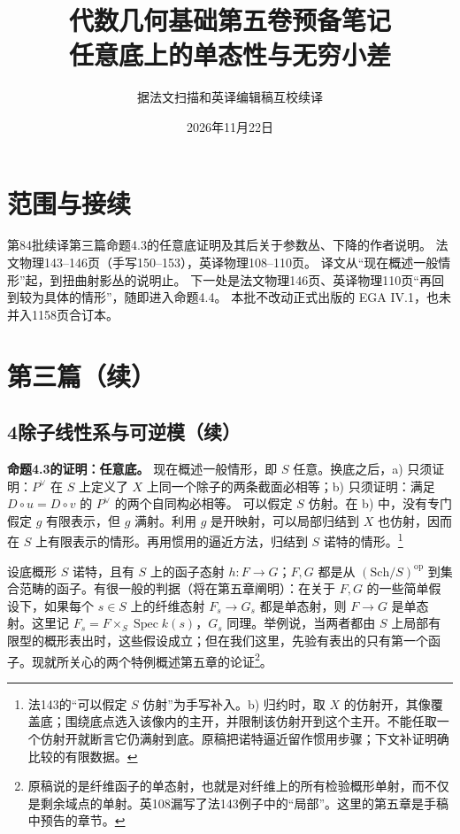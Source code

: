 \documentclass[openany,fontset=fandol]{ctexbook}
\DeclareMathOperator{\Spec}{Spec}
\begin{document}
\title{代数几何基础第五卷预备笔记\\任意底上的单态性与无穷小差}
\author{据法文扫描和英译编辑稿互校续译}
\date{2026年11月22日}
\maketitle
\chapter*{范围与接续}
第84批续译第三篇命题4.3的任意底证明及其后关于参数丛、下降的作者说明。
法文物理143--146页（手写150--153），英译物理108--110页。
译文从“现在概述一般情形”起，到扭曲射影丛的说明止。
下一处是法文物理146页、英译物理110页“再回到较为具体的情形”，随即进入命题4.4。
本批不改动正式出版的 EGA IV.1，也未并入1158页合订本。

\chapter*{第三篇（续）}
\section*{4\quad 除子线性系与可逆模（续）}
\noindent\textbf{命题4.3的证明：任意底。}
现在概述一般情形，即 \(S\) 任意。换底之后，a) 只须证明：\(P^\vee\) 在 \(S\) 上定义了 \(X\) 上同一个除子的两条截面必相等；b) 只须证明：满足 \(D\circ u=D\circ v\) 的 \(P^\vee\) 的两个自同构必相等。
可以假定 \(S\) 仿射。在 b) 中，没有专门假定 \(g\) 有限表示，但 \(g\) 满射。利用 \(g\) 是开映射，可以局部归结到 \(X\) 也仿射，因而在 \(S\) 上有限表示的情形。再用惯用的逼近方法，归结到 \(S\) 诺特的情形。\footnote{法143的“可以假定 \(S\) 仿射”为手写补入。b) 归约时，取 \(X\) 的仿射开，其像覆盖底；围绕底点选入该像内的主开，并限制该仿射开到这个主开。不能任取一个仿射开就断言它仍满射到底。原稿把诺特逼近留作惯用步骤；下文补证明确比较的有限数据。}

设底概形 \(S\) 诺特，且有 \(S\) 上的函子态射 \(h:F\to G\)；\(F,G\) 都是从 \((\mathrm{Sch}/S)^{\mathrm{op}}\) 到集合范畴的函子。有很一般的判据（将在第五章阐明）：在关于 \(F,G\) 的一些简单假设下，如果每个 \(s\in S\) 上的纤维态射 \(F_s\to G_s\) 都是单态射，则 \(F\to G\) 是单态射。这里记 \(F_s=F\times_S\Spec k(s)\)，\(G_s\) 同理。举例说，当两者都由 \(S\) 上局部有限型的概形表出时，这些假设成立；但在我们这里，先验有表出的只有第一个函子。现就所关心的两个特例概述第五章的论证\nobreak\footnote{原稿说的是纤维函子的单态射，也就是对纤维上的所有检验概形单射，而不仅是剩余域点的单射。英108漏写了法143例子中的“局部”。这里的第五章是手稿中预告的章节。}。
\end{document}
